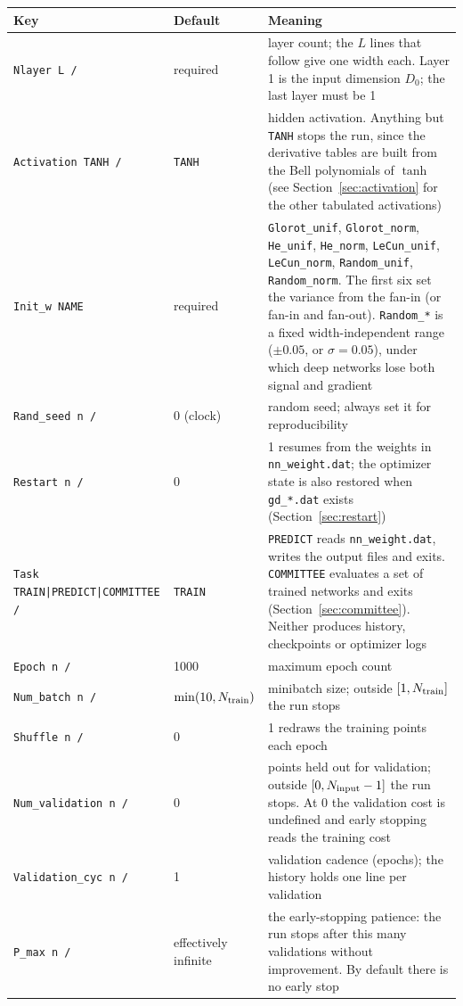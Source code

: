 \documentclass[10pt,a4paper]{article}
\newcommand{\code}[1]{\texttt{#1}}
\begin{document}
\begin{longtable}{@{}p{}p{}p{}@{}}
\toprule
Key & Default & Meaning \\
\midrule
\endhead
\code{Nlayer L /} & required & layer count; the $L$ lines that follow give one width each. Layer 1 is the input dimension $D_0$; the last layer must be 1\\
\code{Activation TANH /} & \code{TANH} & hidden activation. Anything but \code{TANH} stops the run, since the derivative tables are built from the Bell polynomials of $\tanh$ (see Section~\ref{sec:activation} for the other tabulated activations)\\
\code{Init\_w NAME} & required & \code{Glorot\_unif}, \code{Glorot\_norm}, \code{He\_unif}, \code{He\_norm}, \code{LeCun\_unif}, \code{LeCun\_norm}, \code{Random\_unif}, \code{Random\_norm}. The first six set the variance from the fan-in (or fan-in and fan-out). \code{Random\_*} is a fixed width-independent range ($\pm 0.05$, or $\sigma=0.05$), under which deep networks lose both signal and gradient\\
\code{Rand\_seed n /} & 0 (clock) & random seed; always set it for reproducibility\\
\code{Restart n /} & 0 & 1 resumes from the weights in \code{nn\_weight.dat}; the optimizer state is also restored when \code{gd\_*.dat} exists (Section~\ref{sec:restart})\\
\code{Task TRAIN|PREDICT|COMMITTEE /} & \code{TRAIN} & \code{PREDICT} reads \code{nn\_weight.dat}, writes the output files and exits. \code{COMMITTEE} evaluates a set of trained networks and exits (Section~\ref{sec:committee}). Neither produces history, checkpoints or optimizer logs\\
\code{Epoch n /} & 1000 & maximum epoch count\\
\code{Num\_batch n /} & $\min(10,N_{\rm train})$ & minibatch size; outside $[1,N_{\rm train}]$ the run stops\\
\code{Shuffle n /} & 0 & 1 redraws the training points each epoch\\
\code{Num\_validation n /} & 0 & points held out for validation; outside $[0,N_{\rm input}-1]$ the run stops. At 0 the validation cost is undefined and early stopping reads the training cost\\
\code{Validation\_cyc n /} & 1 & validation cadence (epochs); the history holds one line per validation\\
\code{P\_max n /} & effectively infinite & the early-stopping patience: the run stops after this many validations without improvement. By default there is no early stop\\

\end{longtable}
\end{document}
